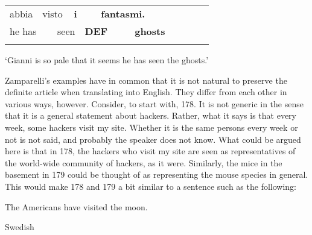 \begin{tabular}{llllllllllll}
\lsptoprule
abbia & \multicolumn{2}{l}{visto

} & \multicolumn{2}{l}{{\bfseries i}

} & \multicolumn{2}{l}{{\bfseries fantasmi.}

} & \multicolumn{2}{l}{} & \multicolumn{2}{l}{} & \\
\multicolumn{2}{l}{he has

} & \multicolumn{2}{l}{seen

} & \multicolumn{2}{l}{{\bfseries DEF}

} & \multicolumn{2}{l}{{\bfseries ghosts}

} & \multicolumn{2}{l}{} & \multicolumn{2}{l}{}\\
\lspbottomrule
\end{tabular}

\begin{styleTranslation}
‘Gianni is so pale that it seems he has seen the ghosts.’

\end{styleTranslation}

\begin{styleBodyTextFirst}
Zamparelli’s examples have in common that it is not natural to preserve the definite article when translating into English. They differ from each other in various ways, however. Consider, to start with, 178. It is not generic in the sense that it is a general statement about hackers. Rather, what it says is that every week, some hackers visit my site. Whether it is the same persons every week or not is not said, and probably the speaker does not know. What could be argued here is that in 178, the hackers who visit my site are seen as representatives of the world-wide community of hackers, as it were. Similarly, the mice in the basement in 179 could be thought of as representing the mouse species in general. This would make 178 and 179 a bit similar to a sentence such as the following: 

\end{styleBodyTextFirst}

\begin{listWWNumileveli}
\item 

\begin{styleExample}
\label{bkm:Ref69031158}The Americans have visited the moon.

\end{styleExample}

\item 

\begin{styleExample}
\label{bkm:Ref77501116}Swedish

\end{styleExample}

\end{listWWNumileveli}

